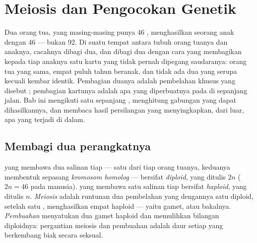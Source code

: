 \chapter{Meiosis dan Pengocokan Genetik}\label{ch:g12:meiosis-genetic-shuffling}

Dua orang tua, yang masing-masing punya 46 , menghasilkan
seorang anak dengan 46 --- bukan 92. Di suatu tempat antara tubuh orang
tuanya dan anaknya, cacahnya dibagi dua, dan dibagi dua dengan cara
yang membagikan kepada tiap anaknya satu kartu yang tidak pernah
dipegang saudaranya: orang tua yang sama, empat puluh tahun beranak,
dan tidak ada dua yang serupa kecuali kembar identik. Pembagian duanya
adalah pembelahan khusus yang disebut ; pembagian kartunya
adalah apa yang diperbuatnya pada  di sepanjang jalan. Bab
ini mengikuti satu  sepanjang , menghitung gabungan yang
dapat dihasilkannya, dan membaca hasil persilangan yang menyingkapkan,
dari luar, apa yang terjadi di dalam.

\section{Membagi dua perangkatnya}

\begin{definition}\label{def:g12:meiosis-genetic-shuffling:meiosis}
 yang membawa dua salinan tiap  --- satu dari tiap orang
tuanya, keduanya membentuk sepasang \emph{kromosom homolog} --- bersifat
\emph{diploid}, yang ditulis $2n$ ($2n = 46$ pada
manusia).  yang membawa satu salinan tiap  bersifat
\emph{haploid}, yang ditulis $n$.
\emph{Meiosis} adalah runtunan dua pembelahan yang
dengannya satu  diploid, setelah satu ,
menghasilkan empat  haploid --- yaitu gamet, atau bakalnya.
\emph{Pembuahan} menyatukan dua gamet haploid dan memulihkan bilangan
diploidnya: pergantian meiosis dan pembuahan adalah daur setiap 
yang berkembang biak secara seksual.
\end{definition}

